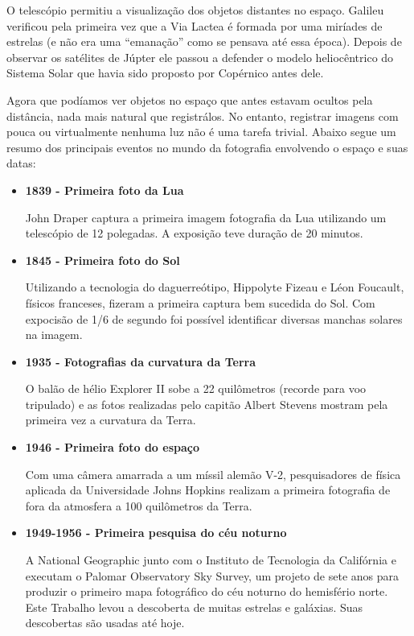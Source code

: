 \documentclass[
	article,			%
	12pt,				%
	oneside,			%
	a4paper,			%
	english,			%
	brazil,				%
	sumario=tradicional
	]{abntex2}
\begin{document}
O telescópio permitiu a visualização dos objetos distantes no espaço. Galileu 
verificou pela primeira vez que a Via Lactea é formada por uma miríades de 
estrelas (e não era uma ``emanação'' como se pensava até essa época). Depois de
observar os satélites de Júpter ele passou a defender o modelo heliocêntrico do
Sistema Solar que havia sido proposto por Copérnico antes dele.

Agora que podíamos ver objetos no espaço que antes estavam ocultos pela
distância, nada mais natural que registrálos. No entanto, registrar imagens com
pouca ou virtualmente nenhuma luz não é uma tarefa trivial. Abaixo segue um
resumo dos principais eventos no mundo da fotografia envolvendo o espaço e suas
datas:

\begin{itemize}
	\item \textbf{1839 - Primeira foto da Lua}

	John Draper captura a primeira imagem fotografia da Lua utilizando um 
	telescópio de 12 polegadas. A exposição teve duração de 20 minutos.
	\cite{fotografia2011ng}

	\item \textbf{1845 - Primeira foto do Sol}

	Utilizando a tecnologia do daguerreótipo, Hippolyte Fizeau e Léon Foucault,
	físicos franceses, fizeram a primeira captura bem sucedida do Sol. Com
	expocisão de 1/6 de segundo foi possível identificar diversas manchas
	solares na imagem. \cite{fotografia2011ng}

	\item \textbf{1935 - Fotografias da curvatura da Terra}

	O balão de hélio Explorer II sobe a 22 quilômetros (recorde para voo 
	tripulado) e as fotos realizadas pelo capitão Albert Stevens mostram pela
	primeira vez a curvatura da Terra. \cite{fotografia2011ng}

	\item \textbf{1946 - Primeira foto do espaço}

	Com uma câmera amarrada a um míssil alemão V-2, pesquisadores de física
	aplicada da Universidade Johns Hopkins realizam a primeira fotografia de 
	fora da atmosfera a 100 quilômetros da Terra. \cite{fotografia2011ng}

	\item \textbf{1949-1956 - Primeira pesquisa do céu noturno}

	A National Geographic junto com o Instituto de Tecnologia da Califórnia e
	executam o Palomar Observatory Sky Survey, um projeto de sete anos para
	produzir o primeiro mapa fotográfico do céu noturno do hemisfério norte.
	Este Trabalho levou a descoberta de muitas estrelas e galáxias. Suas
	descobertas são usadas até hoje. \cite{fotografia2011ng}


\end{itemize}
\end{document}
